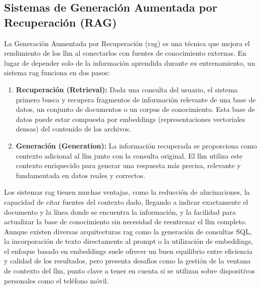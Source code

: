\subsection{Sistemas de Generación Aumentada por Recuperación (RAG)}
La Generación Aumentada por Recuperación (\gls{rag}) es una técnica que mejora el rendimiento de los \gls{llm} al conectarlos con fuentes de conocimiento externas. En lugar de depender solo de la información aprendida durante su entrenamiento, un sistema \gls{rag} funciona en dos pasos:
\begin{enumerate}
    \item \textbf{Recuperación (Retrieval):} Dada una consulta del usuario, el sistema primero busca y recupera fragmentos de información relevante de una base de datos, un conjunto de documentos o un corpus de conocimiento. Esta base de datos puede estar compuesta por embeddings (representaciones vectoriales densas) del contenido de los archivos.
    \item \textbf{Generación (Generation):} La información recuperada se proporciona como contexto adicional al \gls{llm} junto con la consulta original. El \gls{llm} utiliza este contexto enriquecido para generar una respuesta más precisa, relevante y fundamentada en datos reales y correctos.
\end{enumerate}
Los sistemas \gls{rag} tienen muchas ventajas, como la reducción de alucinaciones, la capacidad de citar fuentes del contexto dado, llegando a indicar exactamente el documento y la línea donde se encuentra la información, y la facilidad para actualizar la base de conocimiento sin necesidad de reentrenar el \gls{llm} completo. Aunque existen diversas arquitecturas \gls{rag} como la generación de consultas SQL, la incorporación de texto directamente al prompt o la utilización de embeddings, el enfoque basado en embeddings suele ofrecer un buen equilibrio entre eficiencia y calidad de los resultados, pero presenta desafíos como la gestión de la ventana de contexto del \gls{llm}, punto clave a tener en cuenta si se utilizan sobre dispositivos personales como el teléfono móvil.

